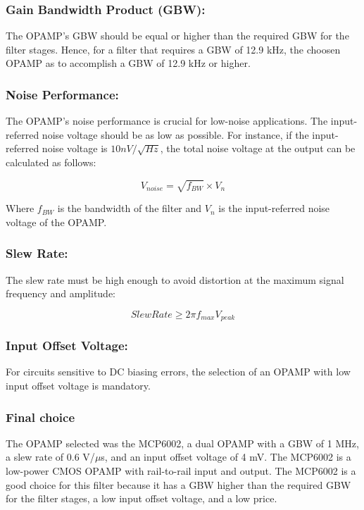 \subsubsection{Gain Bandwidth Product (GBW):}

The OPAMP's GBW should be equal or higher than the required GBW for the filter stages. Hence, for a filter that requires a GBW of 12.9 kHz, the choosen OPAMP as to accomplish a GBW of 12.9 kHz or higher.

\subsubsection{Noise Performance:}

The OPAMP's noise performance is crucial for low-noise applications. The input-referred noise voltage should be as low as possible. For instance, if the input-referred noise voltage is $10 nV/\sqrt{Hz}$, the total noise voltage at the output can be calculated as follows:

\begin{equation}
    V_{noise} = \sqrt{f_{BW}} \times V_{n}
\end{equation}

Where $f_{BW}$ is the bandwidth of the filter and $V_{n}$ is the input-referred noise voltage of the OPAMP.

\subsubsection{Slew Rate:}

The slew rate must be high enough to avoid distortion at the maximum signal frequency and amplitude:

\begin{equation}
    Slew Rate \geq 2\pi f_{max} V_{peak}
\end{equation}

\subsubsection{Input Offset Voltage:}

For circuits sensitive to DC biasing errors, the selection of an OPAMP with low input offset voltage is mandatory.

\subsubsection{Final choice}
The OPAMP selected was the MCP6002, a dual OPAMP with a GBW of 1 MHz, a slew rate of 0.6 V/$\mu$s, and an input offset voltage of 4 mV. The MCP6002 is a low-power CMOS OPAMP with rail-to-rail input and output. The MCP6002 is a good choice for this filter because it has a GBW higher than the required GBW for the filter stages, a low input offset voltage, and a low price\textsuperscript{\cite{MCP6001_datasheet}}.
